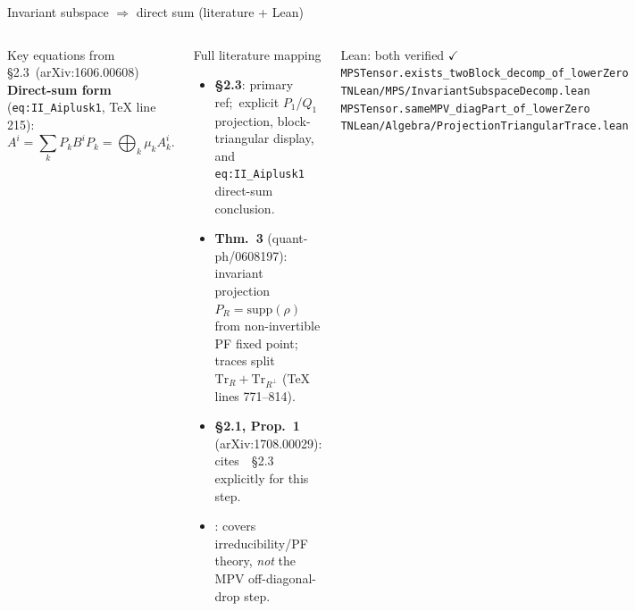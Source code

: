 \documentclass[aspectratio=169,10pt]{beamer}
\begin{document}
\begin{frame}{Invariant subspace $\Rightarrow$ direct sum (literature + Lean)}
\begin{columns}[T]
\begin{block}{Key equations from~\cite{Cirac2017Annals} \S2.3~(arXiv:1606.00608)}
            \textbf{Direct-sum form} (\texttt{eq:II\_Aiplusk1}, TeX line 215):
            \vspace{-0.2em}
            \[
                A^i = \sum_k P_k B^i P_k = \bigoplus_{k} \mu_k A_k^i.
            \]
        \end{block}

        \begin{block}{Full literature mapping}
            \begin{itemize}\itemsep0.15em
                \item[(a)] \textbf{\cite{Cirac2017Annals} \S2.3}: primary ref;\
                      explicit $P_1$/$Q_1$ projection, block-triangular display,
                      and \texttt{eq:II\_Aiplusk1} direct-sum conclusion.
                \item[(b)] \textbf{\cite{Perez-Garcia2007Matrix} Thm.~3} (quant-ph/0608197):
                      invariant projection $P_R = \mathrm{supp}(\rho)$ from
                      non-invertible PF fixed point;
                      traces split $\mathrm{Tr}_R + \mathrm{Tr}_{R^\perp}$
                      (TeX lines 771--814).
                \item[(c)] \textbf{\cite{Cirac2017Irreducible} \S2.1, Prop.~1}
                      (arXiv:1708.00029): cites~\cite{Cirac2017Annals}~\S2.3
                      explicitly for this step.
                \item[$\times$] \textcolor{dimwhite}{\footnotesize
                      \cite{Wolf2012Quantum}: covers irreducibility/PF theory,
                      \emph{not} the MPV off-diagonal-drop step.}
            \end{itemize}
        \end{block}

        \begin{block}{Lean: both verified $\checkmark$}
            {\scriptsize
            \texttt{MPSTensor.exists\_twoBlock\_decomp\_of\_lowerZero}\\
            \textcolor{dimwhite}{\texttt{TNLean/MPS/InvariantSubspaceDecomp.lean}}\\[0.3em]
            \texttt{MPSTensor.sameMPV\_diagPart\_of\_lowerZero}\\
            \textcolor{dimwhite}{\texttt{TNLean/Algebra/ProjectionTriangularTrace.lean}}
            }
        \end{block}
    \end{columns}
\end{frame}
\end{document}
